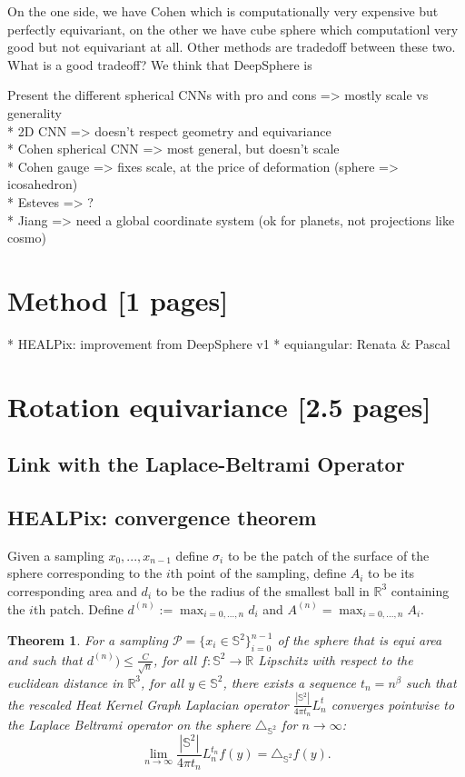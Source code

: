 \documentclass{article} %
\newtheorem{theorem}{Theorem}[section]
\begin{document}
On the one side, we have Cohen which is computationally very expensive but perfectly equivariant, on the other we have cube sphere which computationl very good but not equivariant at all. Other methods are tradedoff between these two. What is a good tradeoff? We think that DeepSphere is

Present the different spherical CNNs with pro and cons => mostly scale vs generality\\
* 2D CNN => doesn't respect geometry and equivariance\\
* Cohen spherical CNN => most general, but doesn't scale\\
* Cohen gauge => fixes scale, at the price of deformation (sphere => icosahedron)\\
* Esteves => ? \\
* Jiang => need a global coordinate system (ok for planets, not projections like cosmo)\\

\section{Method [1 pages]}

* HEALPix: improvement from DeepSphere v1 \cite{perraudin2019deepsphere}
* equiangular: Renata \& Pascal

\section{Rotation equivariance [2.5 pages]}

\subsection{Link with the Laplace-Beltrami Operator}

\subsection{HEALPix: convergence theorem}
Given a sampling $x_0, ..., x_{n-1}$ define $\sigma_i$ to be the patch of the surface of the sphere corresponding to the $i$th point of the sampling, define $A_i$ to be its corresponding area and $d_i$ to be the radius of the smallest ball in $\mathbb R^3$ containing the $i$th patch. Define $d^{(n)} := \max_{i=0, ..., n}d_i$ and $A^{(n)}=\max_{i=0, ..., n}A_i$.\\
	\begin{theorem}
		For a sampling $\mathcal P = \{x_i\in\mathbb S^2\}_{i=0}^{n-1}$ of the sphere that is equi area and such that $d^{(n)})\leq \frac{C}{\sqrt{n}}$, for all $f: \mathbb S^2 \rightarrow \mathbb R$ Lipschitz with respect to the euclidean distance in $\mathbb R^3$, for all $y\in\mathbb S^2$, there exists a sequence $t_n = n^\beta$ such that the rescaled Heat Kernel Graph Laplacian operator $\frac{|\mathbb S^2|}{4\pi t_n}L^t_n$ converges pointwise to the Laplace Beltrami operator on the sphere $\triangle_{\mathbb S^2}$  for $n\to\infty$:
		$$ \lim_{n\to\infty}\frac{|\mathbb S^2|}{4\pi t_n} L_n^{t_n}f(y) =  \triangle_{\mathbb S^2}f(y).$$
		\label{theo:pointwise convergence in the healpix case}
	\end{theorem}
	
\end{document}

